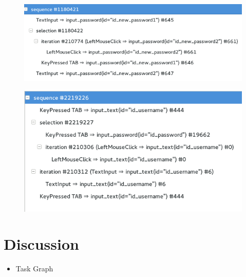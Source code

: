 \begin{itemize}
\begin{figure}
	\caption{}
	\label{}
\end{figure}
\begin{figure}
	\centering
	\includegraphics[]{chapters/casestudy/newpassword-1.png}
	\caption{}
	\label{}
\end{figure}
\begin{figure}
	\centering
	\includegraphics[]{chapters/casestudy/login_process_repeated.png}
	\caption{}
	\label{}
\end{figure}
\end{itemize}


\section{Discussion}
\begin{itemize}
	\item Task Graph
\end{itemize}
